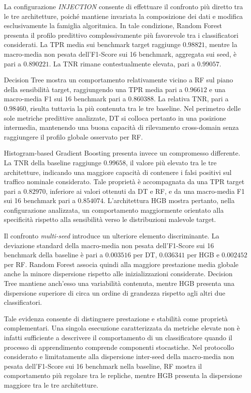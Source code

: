 La configurazione \textit{INJECTION} consente di effettuare il confronto più diretto tra le tre architetture, poiché mantiene invariata la composizione dei dati e modifica esclusivamente la famiglia algoritmica.
In tale condizione, Random Forest presenta il profilo predittivo complessivamente più favorevole tra i classificatori considerati.
La TPR media sui benchmark target raggiunge $0.98821$, mentre la macro-media non pesata dell'F1-Score sui 16 benchmark, aggregata sui seed, è pari a $0.890221$.
La TNR rimane contestualmente elevata, pari a $0.99057$.

Decision Tree mostra un comportamento relativamente vicino a RF sul piano della sensibilità target, raggiungendo una TPR media pari a $0.96612$ e una macro-media F1 sui 16 benchmark pari a $0.860388$.
La relativa TNR, pari a $0.98460$, risulta tuttavia la più contenuta tra le tre baseline.
Nel perimetro delle sole metriche predittive analizzate, DT si colloca pertanto in una posizione intermedia, mantenendo una buona capacità di rilevamento cross-domain senza raggiungere il profilo globale osservato per RF.

Histogram-based Gradient Boosting presenta invece un compromesso differente.
La TNR della baseline raggiunge $0.99658$, il valore più elevato tra le tre architetture, indicando una maggiore capacità di contenere i falsi positivi sul traffico nominale considerato.
Tale proprietà è accompagnata da una TPR target pari a $0.82970$, inferiore ai valori ottenuti da DT e RF, e da una macro-media F1 sui 16 benchmark pari a $0.854074$.
L'architettura HGB mostra pertanto, nella configurazione analizzata, un comportamento maggiormente orientato alla specificità rispetto alla sensibilità verso le distribuzioni malevole target.

Il confronto \textit{multi-seed} introduce un ulteriore elemento discriminante.
La deviazione standard della macro-media non pesata dell'F1-Score sui 16 benchmark della baseline è pari a $0.003516$ per DT, $0.036341$ per HGB e $0.002452$ per RF.
Random Forest associa quindi alla maggiore prestazione media globale anche la minore dispersione rispetto alle inizializzazioni considerate.
Decision Tree mantiene anch'esso una variabilità contenuta, mentre HGB presenta una dispersione superiore di circa un ordine di grandezza rispetto agli altri due classificatori.

Tale evidenza consente di distinguere prestazione e stabilità come proprietà complementari.
Una singola esecuzione caratterizzata da metriche elevate non è infatti sufficiente a descrivere il comportamento di un classificatore quando il processo di apprendimento comprende componenti stocastiche.
Nel protocollo considerato e limitatamente alla dispersione inter-seed della macro-media non pesata dell'F1-Score sui 16 benchmark nella baseline, RF mostra il comportamento più regolare tra le repliche, mentre HGB presenta la dispersione maggiore tra le tre architetture.

